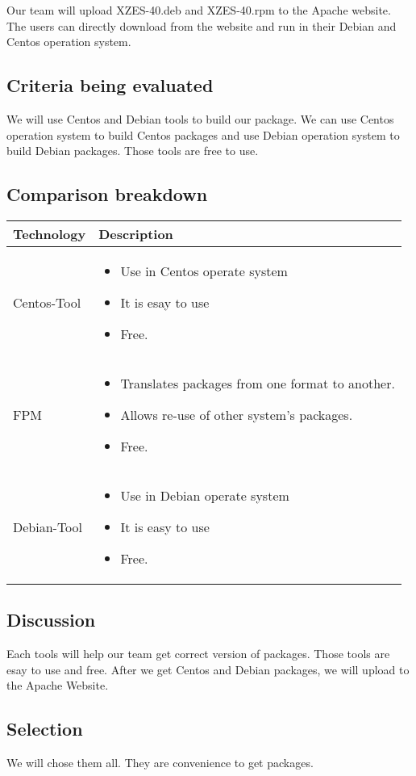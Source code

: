 Our team will upload XZES-40.deb and XZES-40.rpm to the Apache website. The users can directly download from the website and run in their Debian and Centos operation system.  

\subsection{Criteria being evaluated}

We will use Centos and Debian tools to build our package. We can use Centos operation system to build Centos packages and use Debian operation system to build Debian packages. Those tools are free to use. 

\subsection{Comparison breakdown}

\begin{center}
  \begin{tabular}{ | l | p{10cm} |}
    \hline
    Technology & Description  \\ \hline
    Centos-Tool \cite{centos-tool} &
    \begin{itemize}
      \item Use in Centos operate system 
      \item It is esay to use
      \item Free.
    \end{itemize}\\ \hline
    FPM \cite{fpm-home} &
    \begin{itemize}
      \item Translates packages from one format to another.
      \item Allows re-use of other system's packages.
      \item Free.
    \end{itemize}\\ \hline
    Debian-Tool \cite{debian-tool} &
    \begin{itemize}
      \item Use in Debian operate system
      \item It is easy to use
      \item Free.
    \end{itemize}\\ \hline
  \end{tabular}
\end{center}

\subsection{Discussion}

Each tools will help our team get correct version of packages. Those tools are esay to use and free. After we get Centos and Debian packages, we will upload to the Apache Website. 

\subsection{Selection}

We will chose them all. They are convenience to get packages. 

